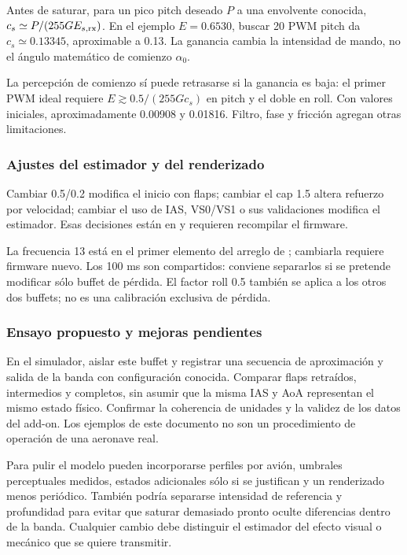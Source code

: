 Antes de saturar, para un pico pitch deseado $P$ a una envolvente conocida, $c_s\simeq P/(255GE_{s,\rm rx})$. En el ejemplo $E=0.6530$, buscar 20 PWM pitch da $c_s\simeq0.13345$, aproximable a 0.13. La ganancia cambia la intensidad de mando, no el ángulo matemático de comienzo $\alpha_0$.

La percepción de comienzo sí puede retrasarse si la ganancia es baja: el primer PWM ideal requiere $E\gtrsim0.5/(255Gc_s)$ en pitch y el doble en roll. Con valores iniciales, aproximadamente 0.00908 y 0.01816. Filtro, fase y fricción agregan otras limitaciones.

\subsubsection{Ajustes del estimador y del renderizado}
Cambiar 0.5/0.2 modifica el inicio con flaps; cambiar el cap 1.5 altera refuerzo por velocidad; cambiar el uso de IAS, VS0/VS1 o sus validaciones modifica el estimador. Esas decisiones están en  y requieren recompilar el firmware.

La frecuencia 13 está en el primer elemento del arreglo de ; cambiarla requiere firmware nuevo. Los 100 ms son compartidos: conviene separarlos si se pretende modificar sólo buffet de pérdida. El factor roll 0.5 también se aplica a los otros dos buffets; no es una calibración exclusiva de pérdida.

\subsubsection{Ensayo propuesto y mejoras pendientes}
En el simulador, aislar este buffet y registrar una secuencia de aproximación y salida de la banda con configuración conocida. Comparar flaps retraídos, intermedios y completos, sin asumir que la misma IAS y AoA representan el mismo estado físico. Confirmar la coherencia de unidades y la validez de los datos del add-on. Los ejemplos de este documento no son un procedimiento de operación de una aeronave real.

Para pulir el modelo pueden incorporarse perfiles por avión, umbrales perceptuales medidos, estados adicionales sólo si se justifican y un renderizado menos periódico. También podría separarse intensidad de referencia y profundidad para evitar que saturar demasiado pronto oculte diferencias dentro de la banda. Cualquier cambio debe distinguir el estimador del efecto visual o mecánico que se quiere transmitir.

